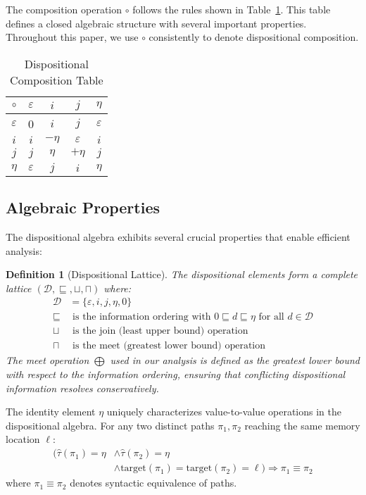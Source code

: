 \documentclass[journal]{IEEEtran}
\newtheorem{definition}{Definition}
\begin{document}
The composition operation $\circ$ follows the rules shown in Table~\ref{tab:composition}. This table defines a closed algebraic structure with several important properties. Throughout this paper, we use $\circ$ consistently to denote dispositional composition.

\begin{table}[t]
\centering
\caption{Dispositional Composition Table}
\label{tab:composition}
\begin{tabular}{c|cccc}
\toprule
$\circ$ & $\varepsilon$ & $i$ & $j$ & $\eta$ \\
\midrule
$\varepsilon$ & 0 & $i$ & $j$ & $\varepsilon$ \\
$i$ & $i$ & $-\eta$ & $\varepsilon$ & $i$ \\
$j$ & $j$ & $\eta$ & $+\eta$ & $j$ \\
$\eta$ & $\varepsilon$ & $j$ & $i$ & $\eta$ \\
\bottomrule
\end{tabular}
\end{table}

\subsection{Algebraic Properties}

The dispositional algebra exhibits several crucial properties that enable efficient analysis:

\begin{definition}[Dispositional Lattice]
The dispositional elements form a complete lattice $(\mathcal{D}, \sqsubseteq, \sqcup, \sqcap)$ where:
\begin{align}
\mathcal{D} &= \{\varepsilon, i, j, \eta, 0\} \\
\sqsubseteq &\text{ is the information ordering with } 0 \sqsubseteq d \sqsubseteq \eta \text{ for all } d \in \mathcal{D} \\
\sqcup &\text{ is the join (least upper bound) operation} \\
\sqcap &\text{ is the meet (greatest lower bound) operation}
\end{align}
The meet operation $\bigoplus$ used in our analysis is defined as the greatest lower bound with respect to the information ordering, ensuring that conflicting dispositional information resolves conservatively.
\end{definition}

\begin{lemma}
\label{lem:uniqueness}
The identity element $\eta$ uniquely characterizes value-to-value operations in the dispositional algebra. For any two distinct paths $\pi_1, \pi_2$ reaching the same memory location $\ell$:
\begin{align}
\big( \hat{\tau}(\pi_1) = \eta &\land \hat{\tau}(\pi_2) = \eta \nonumber \\
&\land \text{target}(\pi_1) = \text{target}(\pi_2) = \ell \big) \Rightarrow \pi_1 \equiv \pi_2
\end{align}
where $\pi_1 \equiv \pi_2$ denotes syntactic equivalence of paths.
\end{lemma}
\end{document}
